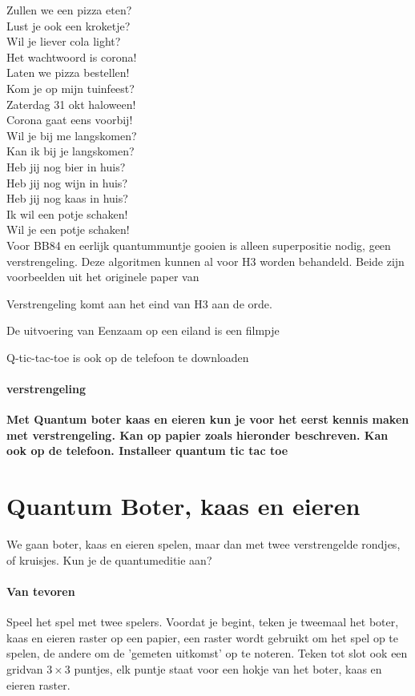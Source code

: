 \documentclass[../../main.tex]{subfiles}
\begin{document}
Zullen we een pizza eten?\\
Lust je ook een kroketje?\\
Wil je liever cola light?\\
Het wachtwoord is corona!\\
Laten we pizza bestellen!\\
Kom je op mijn tuinfeest?\\
Zaterdag 31 okt haloween!\\
Corona gaat eens voorbij!\\
Wil je bij me langskomen?\\
Kan ik bij je langskomen?\\
Heb jij nog bier in huis?\\
Heb jij nog wijn in huis?\\
Heb jij nog kaas in huis?\\
Ik wil een potje schaken!\\
Wil je een potje schaken!\\

Voor BB84 en eerlijk quantummuntje gooien is alleen superpositie nodig, geen verstrengeling. Deze algoritmen kunnen al voor H3 worden behandeld.
Beide zijn voorbeelden uit het originele paper van ~\cite{BENNETT20147}

Verstrengeling komt aan het eind van H3 aan de orde. 

De uitvoering van Eenzaam op een eiland is een filmpje 

Q-tic-tac-toe is ook op de telefoon te downloaden



\paragraph{verstrengeling}
\textbf{Met Quantum boter kaas en eieren kun je voor het eerst kennis maken met verstrengeling. 
 Kan op papier zoals hieronder beschreven. Kan ook op de telefoon. Installeer quantum tic tac toe}


\section{Quantum Boter, kaas en eieren}
We gaan boter, kaas en eieren spelen, maar dan met twee verstrengelde rondjes, of kruisjes. Kun je de quantumeditie aan?

\paragraph*{Van tevoren}
Speel het spel met twee spelers. Voordat je begint, teken je tweemaal het boter, kaas en eieren raster op een papier, een raster wordt gebruikt om het spel op te spelen, de andere om de 'gemeten uitkomst' op te noteren. Teken tot slot ook een gridvan $3 \times 3$ puntjes, elk puntje staat voor een hokje van het boter, kaas en eieren raster.
\end{document}
